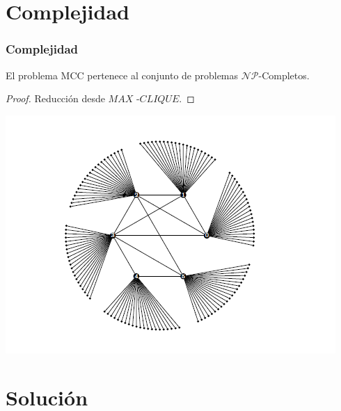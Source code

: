 \section{Complejidad}
\begin{frame}\frametitle{Complejidad}
\begin{proposition}
El problema MCC pertenece al conjunto de problemas $\mathcal{NP}$-Completos.
\end{proposition} 
\begin{proof}
Reducción desde $MAX$ -$CLIQUE$. 
\end{proof}

  \begin{center}
        \includegraphics[scale=0.50]{figuras/Solucion/grafoHM}
 \end{center}
\end{frame}

\section{Solución}
